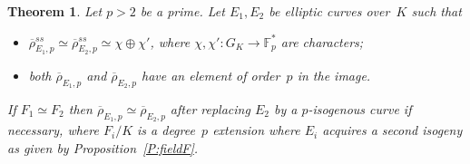 \documentclass[12pt]{amsart}
\newcommand{\F}{\mathbb{F}}
\newcommand{\rhobar}{{\overline{\rho}}}
\numberwithin{equation}{section}
\newtheorem{theorem}{Theorem}[section]
\theoremstyle{definition}
\theoremstyle{remark}
\begin{document}
\begin{theorem} 
Let $p > 2$ be a prime. Let $E_1, E_2$ be elliptic curves 
over~$K$ such that 
\begin{itemize}
 \item[(i)] $\rhobar_{E_1,p}^{ss} \simeq \rhobar_{E_2,p}^{ss} \simeq \chi \oplus \chi'$,  where $\chi, \chi' : G_K \to \F_p^*$ are characters;
 \item[(ii)] both $\rhobar_{E_1,p}$ and $\rhobar_{E_2,p}$ have an element of
 order~$p$ in the image.
\end{itemize}
If $F_1 \simeq F_2$ then $\rhobar_{E_1,p} \simeq \rhobar_{E_2,p}$ 
after replacing $E_2$ by a $p$-isogenous curve if necessary, 
where $F_i/K$ is a degree~$p$ extension where $E_i$ acquires a second isogeny
as given by Proposition~\ref{P:fieldF}.


\end{theorem}
\end{document}
